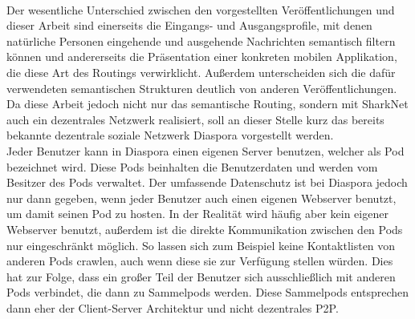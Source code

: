 \\Der wesentliche Unterschied zwischen den vorgestellten Veröffentlichungen und dieser Arbeit sind einerseits die Eingangs- und Ausgangsprofile, mit denen natürliche Personen eingehende und ausgehende Nachrichten semantisch filtern können und andererseits die Präsentation einer konkreten mobilen Applikation, die diese Art des Routings verwirklicht. Außerdem unterscheiden sich die dafür verwendeten semantischen Strukturen deutlich von anderen Veröffentlichungen. 
\\Da diese Arbeit jedoch nicht nur das semantische Routing, sondern mit SharkNet auch ein dezentrales Netzwerk realisiert, soll an dieser Stelle kurz das bereits bekannte dezentrale soziale Netzwerk Diaspora vorgestellt werden.
\\ Jeder Benutzer kann in Diaspora einen eigenen Server benutzen, welcher als Pod bezeichnet wird. Diese Pods beinhalten die Benutzerdaten und werden vom Besitzer des Pods verwaltet. Der umfassende Datenschutz ist bei Diaspora jedoch nur dann gegeben, wenn jeder Benutzer auch einen eigenen Webserver benutzt, um damit seinen Pod zu hosten. In der Realität wird häufig aber kein eigener Webserver benutzt, außerdem ist die direkte Kommunikation zwischen den Pods nur eingeschränkt möglich. So lassen sich zum Beispiel keine Kontaktlisten von anderen Pods crawlen, auch wenn diese sie zur Verfügung stellen würden. Dies hat zur Folge, dass ein großer Teil der Benutzer sich ausschließlich mit anderen Pods verbindet, die dann zu Sammelpods werden. Diese Sammelpods entsprechen dann eher der Client-Server Architektur und nicht dezentrales P2P.
\newpage

